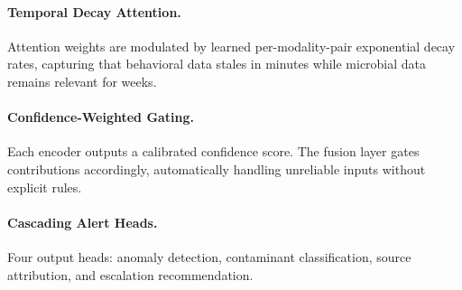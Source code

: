 \paragraph{Temporal Decay Attention.}
Attention weights are modulated by learned per-modality-pair
exponential decay rates, capturing that behavioral data stales
in minutes while microbial data remains relevant for weeks.

\paragraph{Confidence-Weighted Gating.}
Each encoder outputs a calibrated confidence score. The fusion
layer gates contributions accordingly, automatically handling
unreliable inputs without explicit rules.

\paragraph{Cascading Alert Heads.}
Four output heads: anomaly detection, contaminant classification,
source attribution, and escalation recommendation.
